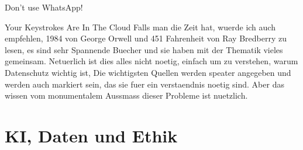 \documentclass{report}
\begin{document}
Don't use WhatsApp!\citep{dont-use-whatsapp}

Your Keystrokes Are In The Cloud \citep{you-keystrokes-are-in-the-cloud}
\newline
Falls man die Zeit hat, wuerde ich auch empfehlen, 1984 von George Orwell und 451 Fahrenheit von Ray Bredberry zu lesen, es sind sehr Spannende Buecher und sie haben mit der Thematik vieles gemeinsam.
Netuerlich ist dies alles nicht noetig, einfach um zu verstehen, warum Datenschutz wichtig ist, Die wichtigsten Quellen werden speater angegeben und werden auch markiert sein, das sie fuer ein verstaendnis noetig sind. Aber das wissen vom monumentalem Aussmass dieser Probleme ist nuetzlich. 
\chapter{KI, Daten und Ethik}
\end{document}
